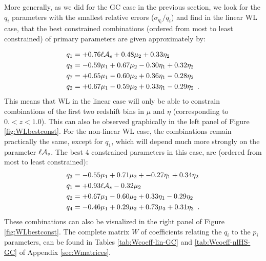 More generally, as we did for the GC case in the previous section, we look for the $q_i$ 
parameters with the smallest relative errors ($\sigma_{q_i}/q_i$) and find in the linear WL case, that the best 
constrained combinations (ordered from most to least constrained) of primary parameters are given approximately by: 

\begin{equation} \label{eq:bestCombined-WLlin}
\begin{aligned}
	q_1  &= +0.76\ell \mathcal{A}_{s} + 0.48 \mu_2 + 0.33\eta_2 \\
	q_3  &= -0.59\mu_1 + 0.67 \mu_2 - 0.30\eta_1 + 0.32 \eta_2\\
	q_7  &= +0.65\mu_1 - 0.60 \mu_2 + 0.36\eta_1 - 0.28 \eta_2\\
	q_2  &= +0.67\mu_1 - 0.59 \mu_2 + 0.33\eta_1 - 0.29 \eta_2 \,\,\, .
\end{aligned}
\end{equation}
This means that WL in the linear case will only be able to constrain 
combinations of the first two redshift bins in $\mu$ and $\eta$ (corresponding to  $ 0. < z < 1.0 $).
This can also be observed graphically in the left panel of Figure \ref{fig:WLbestconst}.
For the non-linear WL case, the combinations remain practically the same, except for $q_1$, which will depend much more strongly on the parameter $\ell \mathcal{A}_{s}$. The best 4 constrained parameters in this case, are (ordered from most to least constrained):
\begin{equation} \label{eq:bestCombined-WLnonlin}
\begin{aligned}
	q_3  &= -0.55\mu_1 + 0.71 \mu_2 + -0.27\eta_1 + 0.34\eta_2\\            
	q_1  &= +0.93\ell \mathcal{A}_{s} - 0.32\mu_2 \\ 
	q_2  &= +0.67\mu_1 - 0.60 \mu_2 + 0.33\eta_1 - 0.29 \eta_2\\
	q_4  &= -0.46\mu_1 + 0.29 \mu_2 + 0.73\mu_3 + 0.31 \eta_3 \,\,\, .
\end{aligned}
\end{equation}
These combinations can also be visualized in the right panel of Figure \ref{fig:WLbestconst}.
The complete matrix $W$ of coefficients relating the $q_i$ to the $p_i$ parameters, can be found in Tables \ref{tab:Wcoeff-lin-GC} and \ref{tab:Wcoeff-nlHS-GC} of Appendix \ref{sec:Wmatrices}.

